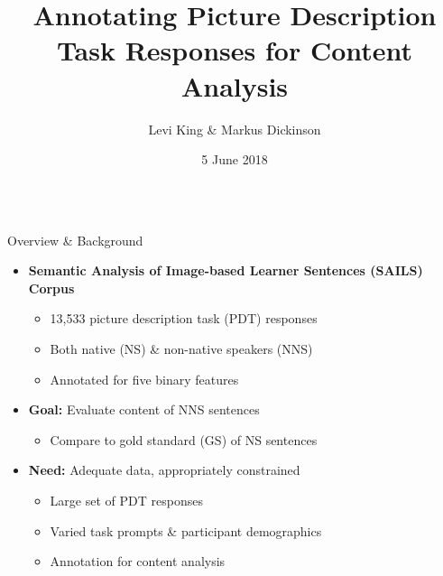 \documentclass[final,t]{beamer}
\title[]{Annotating Picture Description Task Responses for Content Analysis}
\author[]{Levi King \& Markus Dickinson}
\institute[]{Indiana University}
\date[]{5 June 2018}
\begin{document}
\begin{frame}{}
  \begin{columns}[t]
    \begin{column}{.33\linewidth}

\begin{block}{Overview \& Background}
\begin{center}
\begin{minipage}{.85\textwidth}

  \begin{itemize}
    \itemsep1em
  \item{\textbf{Semantic Analysis of Image-based Learner Sentences (SAILS) Corpus}
   \begin{itemize}
   \item 13,533 picture description task (PDT) responses
   \item Both native (NS) \& non-native speakers (NNS)
   \item Annotated for five binary features
      \end{itemize}
    }
\end{itemize}
  \begin{itemize}
    \itemsep1em
  \item{\textbf{Goal:} Evaluate content of NNS sentences 
      \begin{itemize}
      \item Compare to gold standard (GS) of NS sentences
      \end{itemize}
    }
\end{itemize}
  
  \begin{itemize}
    \itemsep1em
  \item{\textbf{Need:}  Adequate data, appropriately constrained
        \begin{itemize}
      \item Large set of PDT responses %
      \item Varied task prompts \& participant demographics %
      \item Annotation for content analysis
      \end{itemize}
    }
\end{itemize}

\end{minipage}
\end{center}
\end{block}


\end{column}
\end{columns}
\end{frame}
\end{document}
